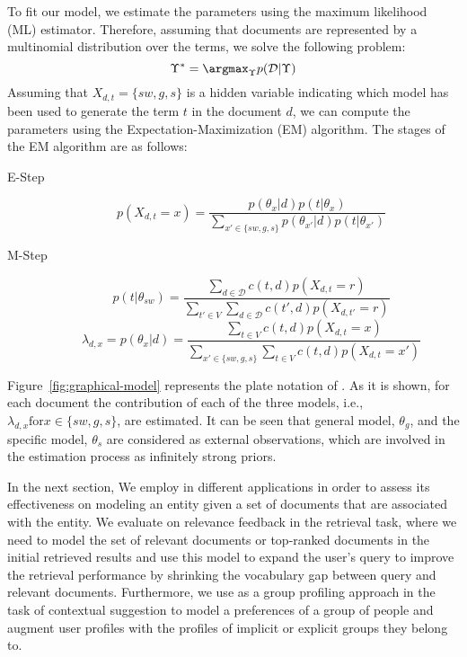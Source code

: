 To fit our model, we estimate the parameters using the maximum likelihood (ML) estimator. Therefore, assuming that documents are represented by a multinomial distribution over the terms, we solve the following problem:
\begin{equation}
\Upsilon^* = \argmax_\Upsilon p(\mathcal{D}|\Upsilon)
\end{equation}
Assuming that $X_{d,t} = \{{sw},g,s\}$ is a hidden variable indicating which model has been used to generate the term $t$ in the document $d$, we can compute the parameters using the Expectation-Maximization (EM) algorithm. 
The stages of the EM algorithm are as follows:
\begin{description}
\item[E-Step]
\begin{equation}
p(X_{d,t} = x) = \frac{p(\theta_x|d)p(t|\theta_x)}{\sum_{x' \in \{sw,g,s\}}p(\theta_{x'}|d)p(t|\theta_{x'})}
\label{EM_e}
\end{equation}
\item[M-Step]
\begin{equation}
p(t|\theta_{sw}) = 
\frac{\sum_{d \in \mathcal{D}}c(t,d) p(X_{d,t} = r)}{\sum_{t' \in V}\sum_{d \in \mathcal{D}}c(t',d) p(X_{d,t'} = r)}
\label{EM_m1}
\end{equation}
\begin{equation}
\lambda_{d,x}  = p(\theta_x|d) = 
\frac{\sum_{t \in V}c(t,d) p(X_{d,t} = x)}{\sum_{x' \in \{sw,g,s\}}\sum_{t \in V}c(t,d) p(X_{d,t} = x')}
\label{EM_m2}
\end{equation}
\end{description}


Figure~\ref{fig:graphical-model} represents the plate notation of \acswlm. As it is shown, for each document the contribution of each of the three models, i.e., $\lambda_{d,x} \text{for} x \in \{sw,g,s\}$, are estimated. It can be seen that general model, $\theta_g$, and the specific model, $\theta_s$ are considered as external observations, which are involved in the estimation process as infinitely strong priors. 


In the next section, We employ \acswlm in different applications in order to assess its effectiveness on modeling an entity given a set of documents that are associated with the entity. We evaluate \acswlm on relevance feedback in the retrieval task, where we need to model the set of relevant documents or top-ranked documents in the initial retrieved results and use this model to expand the user's query to improve the retrieval performance by shrinking the vocabulary gap between query and relevant documents. Furthermore, we use \acswlm as a group profiling approach in the task of contextual suggestion to model a preferences of a group of people and augment user profiles with the profiles of implicit or explicit groups they belong to.